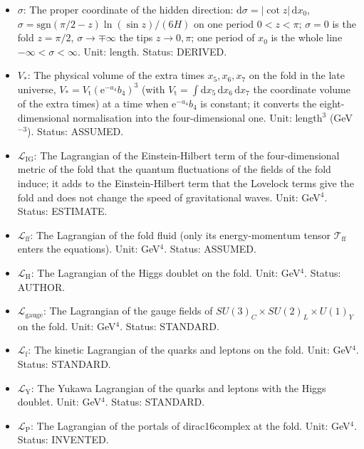\documentclass[
  10pt,
]{article}
\begin{document}
\begin{itemize}
  a smooth function of \(\sigma\) is the value of that function at
  \(\sigma = 0\). Unit: 1/length (for \(\delta_{\mathrm{D}}(\sigma)\)).
  Status: STANDARD.
\item
  \(\sigma\): The proper coordinate of the hidden direction:
  \(\mathrm{d}\sigma = \lvert\cot z\rvert\,\mathrm{d}x_0\),
  \(\sigma = \mathrm{sgn}(\pi/2 - z)\ln(\sin z)/(6H)\) on one period
  \(0 < z < \pi\); \(\sigma = 0\) is the fold \(z = \pi/2\),
  \(\sigma \to \mp\infty\) the tips \(z \to 0, \pi\); one period of
  \(x_0\) is the whole line \(-\infty < \sigma < \infty\). Unit: length.
  Status: DERIVED.
\item
  \(V_*\): The physical volume of the extra times \(x_5, x_6, x_7\) on
  the fold in the late universe,
  \(V_* = V_{\mathrm{t}}(\mathrm{e}^{-a_4}b_4)^3\) (with
  \(V_{\mathrm{t}} = \int\mathrm{d}x_5\,\mathrm{d}x_6\,\mathrm{d}x_7\)
  the coordinate volume of the extra times) at a time when
  \(\mathrm{e}^{-a_4}b_4\) is constant; it converts the
  eight-dimensional normalisation into the four-dimensional one. Unit:
  length\(^3\) (GeV\(^{-3}\)). Status: ASSUMED.
\item
  \(\mathcal{L}_{\mathrm{IG}}\): The Lagrangian of the Einstein-Hilbert
  term of the four-dimensional metric of the fold that the quantum
  fluctuations of the fields of the fold induce; it adds to the
  Einstein-Hilbert term that the Lovelock terms give the fold and does
  not change the speed of gravitational waves. Unit: GeV\(^4\). Status:
  ESTIMATE.
\item
  \(\mathcal{L}_{\mathrm{ff}}\): The Lagrangian of the fold fluid (only
  its energy-momentum tensor \(\mathcal{T}_{\mathrm{ff}}\) enters the
  equations). Unit: GeV\(^4\). Status: ASSUMED.
\item
  \(\mathcal{L}_{\mathrm{H}}\): The Lagrangian of the Higgs doublet on
  the fold. Unit: GeV\(^4\). Status: AUTHOR.
\item
  \(\mathcal{L}_{\mathrm{gauge}}\): The Lagrangian of the gauge fields
  of \(SU(3)_C\times SU(2)_L\times U(1)_Y\) on the fold. Unit:
  GeV\(^4\). Status: STANDARD.
\item
  \(\mathcal{L}_{\mathrm{f}}\): The kinetic Lagrangian of the quarks and
  leptons on the fold. Unit: GeV\(^4\). Status: STANDARD.
\item
  \(\mathcal{L}_{\mathrm{Y}}\): The Yukawa Lagrangian of the quarks and
  leptons with the Higgs doublet. Unit: GeV\(^4\). Status: STANDARD.
\item
  \(\mathcal{L}_{\mathrm{P}}\): The Lagrangian of the portals of
  dirac16complex at the fold. Unit: GeV\(^4\). Status: INVENTED.
\end{itemize}
\end{document}
